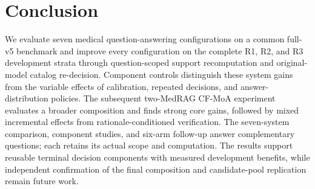 \section{Conclusion}
\label{sec:conclusion}

We evaluate seven medical question-answering configurations on a common full-v5
benchmark and improve every configuration on the complete R1, R2, and R3 development
strata through question-scoped support recomputation and original-model catalog
re-decision. Component controls distinguish these system gains from the variable effects
of calibration, repeated decisions, and answer-distribution policies. The subsequent
two-MedRAG CF-MoA experiment evaluates a broader composition and finds strong core gains,
followed by mixed incremental effects from rationale-conditioned verification. The
seven-system comparison, component studies, and six-arm follow-up answer complementary
questions; each retains its actual scope and computation. The results support reusable
terminal decision components with measured development benefits, while independent
confirmation of the final composition and candidate-pool replication remain future work.
